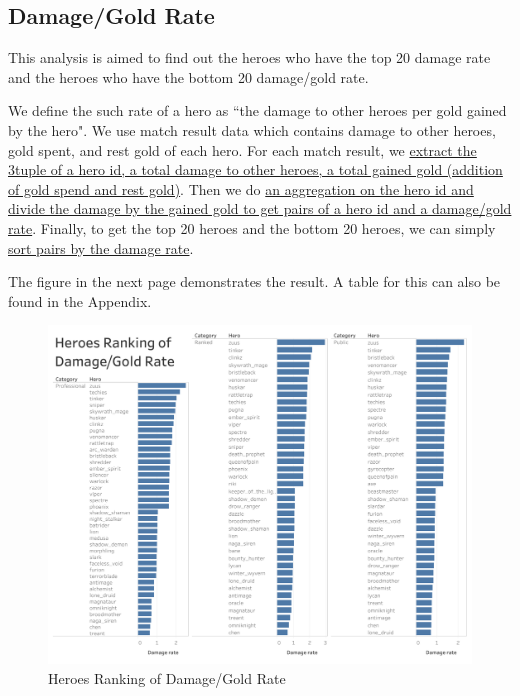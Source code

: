 \documentclass{article}
\begin{document}
\subsection{Damage/Gold Rate}

This analysis is aimed to find out the heroes who have the top 20 damage rate and the heroes who have the bottom 20 damage/gold rate.

We define the such rate of a hero as ``the damage to other heroes per gold gained by the hero". We use match result data which contains damage to other heroes, gold spent, and rest gold of each hero. For each match result, we \href{https://github.com/Vopaaz/big-data-psg-lgd/blob/master/src/main/scala/DamageRate.scala#L39-L41}{extract the 3tuple of a hero id, a total damage to other heroes, a total gained gold (addition of gold spend and rest gold)}. Then we do \href{https://github.com/Vopaaz/big-data-psg-lgd/blob/master/src/main/scala/DamageRate.scala#L42-L44}{an aggregation on the hero id and divide the damage by the gained gold to get pairs of a hero id and a damage/gold rate}. Finally, to get the top 20 heroes and the bottom 20 heroes, we can simply \href{https://github.com/Vopaaz/big-data-psg-lgd/blob/master/src/main/scala/DamageRate.scala#L47-L48}{sort pairs by the damage rate}.

The figure in the next page demonstrates the result. A table for this can also be found in the Appendix.

\begin{figure}[H]
\centering
\includegraphics[width=\textwidth]{pic/DamageRate.png}
\caption{Heroes Ranking of Damage/Gold Rate}
\label{Heroes Ranking of Damage/Gold Rate}
\end{figure}
\end{document}
